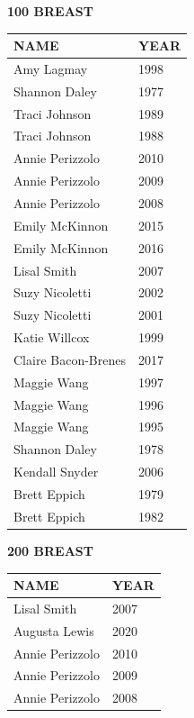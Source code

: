 \begin{table}[H]
\centering
\begin{minipage}[t]{0.48\textwidth}
\centering
\textbf{100 BREAST}\\[0.1cm]
\begin{tabular}{@{}p{2.8cm}p{1.2cm}@{}}
\hline
    \textbf{NAME} & \textbf{YEAR} \\
\hline
    Amy Lagmay & 1998 \\
    Shannon Daley & 1977 \\
    Traci Johnson & 1989 \\
    Traci Johnson & 1988 \\
    Annie Perizzolo & 2010 \\
    Annie Perizzolo & 2009 \\
    Annie Perizzolo & 2008 \\
    Emily McKinnon & 2015 \\
    Emily McKinnon & 2016 \\
    Lisal Smith & 2007 \\
    Suzy Nicoletti & 2002 \\
    Suzy Nicoletti & 2001 \\
    Katie Willcox & 1999 \\
    Claire Bacon-Brenes & 2017 \\
    Maggie Wang & 1997 \\
    Maggie Wang & 1996 \\
    Maggie Wang & 1995 \\
    Shannon Daley & 1978 \\
    Kendall Snyder & 2006 \\
    Brett Eppich & 1979 \\
    Brett Eppich & 1982 \\
\hline
\end{tabular}
\end{minipage}\hfill
\begin{minipage}[t]{0.48\textwidth}
\centering
\textbf{200 BREAST}\\[0.1cm]
\begin{tabular}{@{}p{2.8cm}p{1.2cm}@{}}
\hline
    \textbf{NAME} & \textbf{YEAR} \\
\hline
    Lisal Smith & 2007 \\
    Augusta Lewis & 2020 \\
    Annie Perizzolo & 2010 \\
    Annie Perizzolo & 2009 \\
    Annie Perizzolo & 2008 \\

\end{tabular}
\end{minipage}
\end{table}
